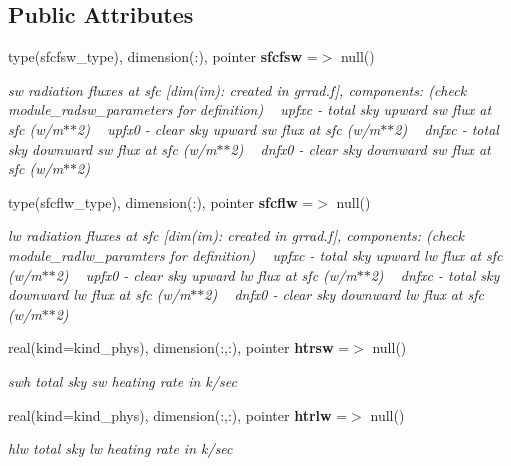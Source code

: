 \subsection*{Public Attributes}
\begin{DoxyCompactItemize}
\item 
type(sfcfsw\+\_\+type), dimension(\+:), pointer \textbf{ sfcfsw} =$>$ null()
\begin{DoxyCompactList}\small\item\em sw radiation fluxes at sfc [dim(im)\+: created in grrad.\+f], components\+: (check module\+\_\+radsw\+\_\+parameters for definition) ~\newline
 upfxc -\/ total sky upward sw flux at sfc (w/m$\ast$$\ast$2) ~\newline
 upfx0 -\/ clear sky upward sw flux at sfc (w/m$\ast$$\ast$2) ~\newline
 dnfxc -\/ total sky downward sw flux at sfc (w/m$\ast$$\ast$2) ~\newline
 dnfx0 -\/ clear sky downward sw flux at sfc (w/m$\ast$$\ast$2) \end{DoxyCompactList}\item 
type(sfcflw\+\_\+type), dimension(\+:), pointer \textbf{ sfcflw} =$>$ null()
\begin{DoxyCompactList}\small\item\em lw radiation fluxes at sfc [dim(im)\+: created in grrad.\+f], components\+: (check module\+\_\+radlw\+\_\+paramters for definition) ~\newline
 upfxc -\/ total sky upward lw flux at sfc (w/m$\ast$$\ast$2) ~\newline
 upfx0 -\/ clear sky upward lw flux at sfc (w/m$\ast$$\ast$2) ~\newline
 dnfxc -\/ total sky downward lw flux at sfc (w/m$\ast$$\ast$2) ~\newline
 dnfx0 -\/ clear sky downward lw flux at sfc (w/m$\ast$$\ast$2) \end{DoxyCompactList}\item 
real(kind=kind\+\_\+phys), dimension(\+:,\+:), pointer \textbf{ htrsw} =$>$ null()
\begin{DoxyCompactList}\small\item\em swh total sky sw heating rate in k/sec \end{DoxyCompactList}\item 
real(kind=kind\+\_\+phys), dimension(\+:,\+:), pointer \textbf{ htrlw} =$>$ null()
\begin{DoxyCompactList}\small\item\em hlw total sky lw heating rate in k/sec \end{DoxyCompactList}\item 

\end{DoxyCompactItemize}

